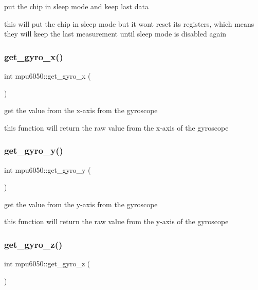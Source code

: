 put the chip in sleep mode and keep last data 

this will put the chip in sleep mode but it won\textquotesingle{}t reset it\textquotesingle{}s registers, which means they will keep the last measurement until sleep mode is disabled again \mbox{\label{classmpu6050_aec7d7275fdb79b4c2e76dea2cdb99763}} 
\subsubsection{\texorpdfstring{get\+\_\+gyro\+\_\+x()}{get\_gyro\_x()}}
{\footnotesize\ttfamily int mpu6050\+::get\+\_\+gyro\+\_\+x (\begin{DoxyParamCaption}{ }\end{DoxyParamCaption})}



get the value from the x-\/axis from the gyroscope 

this function will return the raw value from the x-\/axis of the gyroscope \mbox{\label{classmpu6050_ad02ed5082341b88fe8f0231bcfe41b99}} 
\subsubsection{\texorpdfstring{get\+\_\+gyro\+\_\+y()}{get\_gyro\_y()}}
{\footnotesize\ttfamily int mpu6050\+::get\+\_\+gyro\+\_\+y (\begin{DoxyParamCaption}{ }\end{DoxyParamCaption})}



get the value from the y-\/axis from the gyroscope 

this function will return the raw value from the y-\/axis of the gyroscope \mbox{\label{classmpu6050_aa81a142fcb1ba3a3275bf9e2852434d6}} 
\subsubsection{\texorpdfstring{get\+\_\+gyro\+\_\+z()}{get\_gyro\_z()}}
{\footnotesize\ttfamily int mpu6050\+::get\+\_\+gyro\+\_\+z (\begin{DoxyParamCaption}{ }\end{DoxyParamCaption})}



